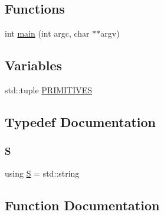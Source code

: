 \subsection*{Functions}
\begin{DoxyCompactItemize}
\item 
int \hyperlink{_formal_language_theory-_simple_2_main_8cpp_a3c04138a5bfe5d72780bb7e82a18e627}{main} (int argc, char $\ast$$\ast$argv)
\end{DoxyCompactItemize}
\subsection*{Variables}
\begin{DoxyCompactItemize}
\item 
std\+::tuple \hyperlink{_formal_language_theory-_simple_2_main_8cpp_a04e6d8e4b74d3f4fc965e5e5449158a3}{P\+R\+I\+M\+I\+T\+I\+V\+ES}
\end{DoxyCompactItemize}


\subsection{Typedef Documentation}
\mbox{\label{_formal_language_theory-_simple_2_main_8cpp_a51c40915539205f0b5add30b0d68a4cb}} 
\subsubsection{\texorpdfstring{S}{S}}
{\footnotesize\ttfamily using \hyperlink{_formal_language_theory-_complex_2_main_8cpp_a51c40915539205f0b5add30b0d68a4cb}{S} =  std\+::string}



\subsection{Function Documentation}
\mbox{\label{_formal_language_theory-_simple_2_main_8cpp_a3c04138a5bfe5d72780bb7e82a18e627}} 
